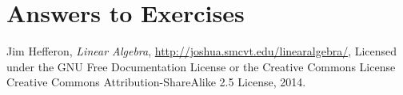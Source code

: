 \documentclass[twocolumn, letterpaper]{book}
\begin{document}
\onecolumn
\thispagestyle{empty}
\titleGP
\newpage
\twocolumn

\thispagestyle{empty}
\tableofcontents

\mainmatter



\appendix
\chapter*{Answers to Exercises}
\shipoutAnswer

\onecolumn
{}
\begin{thebibliography}{9}

  Jim Hefferon,
  \emph{Linear Algebra},
  \url{http://joshua.smcvt.edu/linearalgebra/},
  Licensed under the GNU Free Documentation License or the Creative Commons License Creative Commons Attribution-ShareAlike 2.5 License,
  2014.

\end{thebibliography}
\printindex
\end{document}
